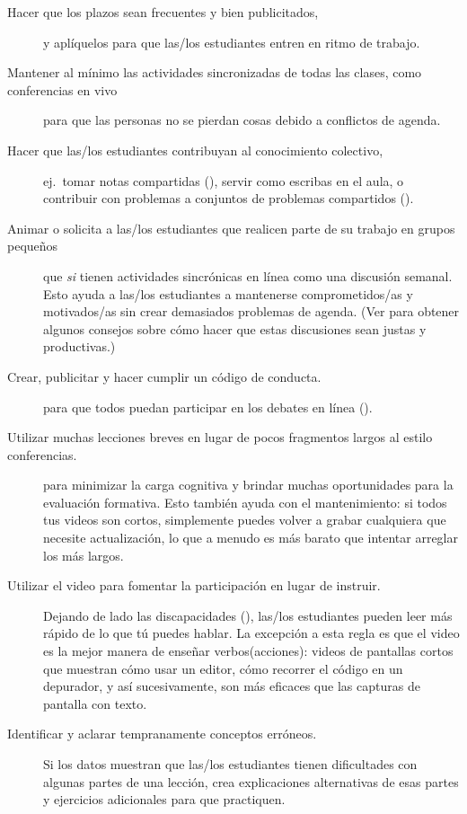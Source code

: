 \begin{description}

\item[Hacer que los plazos sean frecuentes y bien publicitados,]
  y aplíquelos para que las/los estudiantes entren en ritmo de trabajo.

\item[Mantener al mínimo las actividades sincronizadas de todas las clases, como conferencias en vivo]
  para que las personas no se pierdan cosas debido a conflictos de agenda.

\item[Hacer que las/los estudiantes contribuyan al conocimiento colectivo,]
  ej.\ tomar notas compartidas (),
  servir como escribas en el aula,
  o contribuir con problemas a conjuntos de problemas compartidos ().

\item[Animar o solicita a las/los estudiantes que realicen parte de su trabajo en grupos pequeños]
  que \emph{si} tienen actividades sincrónicas en línea
  como una discusión semanal.
  Esto ayuda a las/los estudiantes a mantenerse comprometidos/as y motivados/as sin crear demasiados problemas de agenda.
  (Ver  para obtener algunos consejos sobre cómo hacer que estas discusiones sean justas y productivas.)

\item[Crear, publicitar y hacer cumplir un código de conducta.]
  para que todos puedan participar en los debates en línea ().

\item[Utilizar muchas lecciones breves en lugar de pocos fragmentos largos al estilo conferencias.]
  para minimizar la carga cognitiva
  y brindar muchas oportunidades para la evaluación formativa.
  Esto también ayuda con el mantenimiento:
  si todos tus videos son cortos,
  simplemente puedes volver a grabar cualquiera que necesite actualización,
  lo que a menudo es más barato que intentar arreglar los más largos.

\item[Utilizar el video para fomentar la participación en lugar de instruir.]
  Dejando de lado las discapacidades (),
  las/los estudiantes pueden leer más rápido de lo que tú puedes hablar.
  La excepción a esta regla es que
  el video es la mejor manera de enseñar verbos(acciones):
  videos de pantallas cortos que muestran cómo usar un editor,
  cómo recorrer el código en un depurador,
  y así sucesivamente, son más eficaces que las capturas de pantalla con texto.

\item[Identificar y aclarar tempranamente conceptos erróneos.]
  Si los datos muestran que las/los estudiantes tienen dificultades con algunas partes de una lección,
  crea explicaciones alternativas de esas partes
  y ejercicios adicionales para que practiquen.

\end{description}

